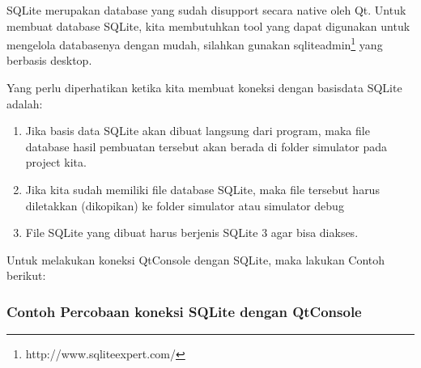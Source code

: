SQLite merupakan database yang sudah disupport secara native oleh Qt.
Untuk membuat database SQLite, kita membutuhkan tool yang dapat
digunakan untuk mengelola databasenya dengan mudah, silahkan gunakan
sqliteadmin\footnote{http://www.sqliteexpert.com/} yang berbasis desktop.

Yang perlu diperhatikan ketika kita membuat koneksi dengan basisdata
SQLite adalah:

\begin{enumerate}


\item
Jika basis data SQLite akan dibuat langsung dari program, maka file
database hasil pembuatan tersebut akan berada di folder simulator pada
project kita.
\item
Jika kita sudah memiliki file database SQLite, maka file tersebut
harus diletakkan (dikopikan) ke folder simulator atau simulator \textfractionsolidus debug
\item
File SQLite yang dibuat harus berjenis SQLite 3 agar bisa diakses.
\end{enumerate}

Untuk melakukan koneksi QtConsole dengan SQLite, maka lakukan Contoh
berikut:

\subsubsection*{Contoh Percobaan koneksi SQLite dengan QtConsole}

